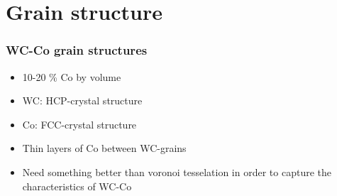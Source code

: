 \documentclass[11pt]{beamer} %
\begin{document}
\section{Grain structure}
\begin{frame}
 \frametitle{WC-Co grain structures}
  \begin{itemize}
  \item 10-20 \% Co by volume
  \item WC: HCP-crystal structure
  \item Co: FCC-crystal structure
  \item Thin layers of Co between WC-grains
  \item Need something better than voronoi tesselation in order to capture the characteristics of WC-Co
  \end{itemize}
  \begin{center}
  \end{center}
\end{frame}
\end{document}
